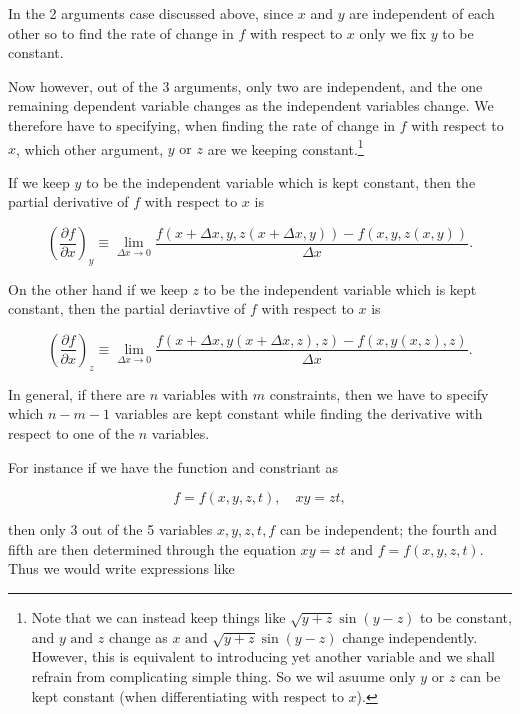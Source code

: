 \documentclass[english,a4paper,12pt]{report}
\begin{document}
In the 2 arguments case discussed above, since \(x\) and \(y\) are independent of each other so to find the rate of change in \(f\) with respect to \(x\) only we fix \(y\) to be constant.

Now however, out of the 3 arguments, only two are independent, and the one remaining dependent variable changes as the independent variables change. We therefore have to specifying, when finding the rate of change in \(f\) with respect to \(x\), which other argument, \(y \text { or } z\) are we keeping constant.\footnote{Note that we can instead keep things like \(\sqrt{y+z}\sin (y-z)\) to be constant, and \(y \text { and } z\) change as \(x \text { and } \sqrt{y+z}\sin (y-z)\) change independently. However, this is equivalent to introducing yet another variable and we shall refrain from complicating simple thing. So we wil asuume only \(y \text { or } z\) can be kept constant (when differentiating with respect to \(x\)).}   

If we keep \(y\) to be the independent variable which is kept constant, then the partial derivative of \(f\) with respect to \(x\) is

\begin{equation}
	\left( \frac{\partial f}{\partial x} \right)_{y} \equiv \lim_{\Delta x \to 0} \frac{f(x+\Delta x,y,z(x+\Delta x,y)) - f(x,y,z(x,y))}{\Delta x}. \label{useless} 
\end{equation}

On the other hand if we keep \(z\) to be the independent variable which is kept constant, then the partial deriavtive of \(f\) with respect to \(x\) is 

\begin{equation}
	\left( \frac{\partial f}{\partial x} \right)_{z} \equiv \lim_{\Delta x \to 0} \frac{f(x+\Delta x, y(x+\Delta x,z),z) - f(x,y(x,z),z)}{\Delta x}. 
\end{equation}


In general, if there are \(n\) variables with \(m\) constraints, then we have to specify which \(n-m-1\) variables are kept constant while finding the derivative with respect to one of the \(n\) variables. 

For instance if we have the function and constriant as 

\begin{equation}
	f = f(x,y,z,t), \quad xy = zt,
\end{equation}

then only 3 out of the 5 variables \(x,y,z,t,f\) can be independent; the fourth and fifth are then determined through the equation \(xy = zt \text { and } f = f(x,y,z,t)\). Thus we would write expressions like
\end{document}
